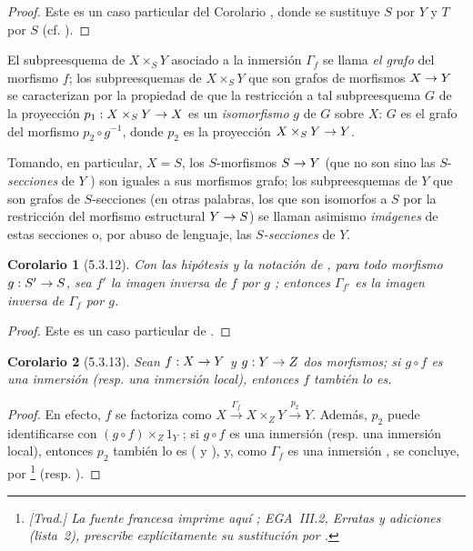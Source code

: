 \documentclass[oneside]{amsart}
\theoremstyle{ega-env-style}
\theoremstyle{ega-thm-env-style}
\newtheorem*{corollary}{Corolario}
\theoremstyle{ega-defn-env-style}
\renewcommand{\to}{\mathchoice{\longrightarrow}{\rightarrow}{\rightarrow}{\rightarrow}}
\newcommand{\oldpage}[2][]{{\marginnote{\normalfont{\textbf{#1}~|~#2}}}\ignorespaces}
\let\EGAOriginalLabel\label
\renewcommand{\label}[1]{\phantomsection\EGAOriginalLabel{#1}}
\begin{document}
\begin{proof}
Este es un caso particular del Corolario , donde se sustituye $S$ por $Y$ y $T$ por $S$ (cf. ).
\end{proof}

\oldpage[I]{134}
El subpreesquema de $X\times_S Y$ asociado a la inmersión $\Gamma_f$  se llama \emph{el grafo} del morfismo $f$;
los subpreesquemas de $X\times_S Y$ que son grafos de morfismos $X\to Y$ se caracterizan por la propiedad de que la restricción a tal subpreesquema $G$ de la proyección $p_1:X\times_S Y\to X$ es un \emph{isomorfismo} $g$ de $G$ sobre $X$:
$G$ es el grafo del morfismo $p_2\circ g^{-1}$, donde $p_2$ es la proyección $X\times_S Y\to Y$.

Tomando, en particular, $X=S$, los $S$-morfismos $S\to Y$ (que no son sino las $S$-\emph{secciones} de $Y$ ) son iguales a sus morfismos grafo;
los subpreesquemas de $Y$ que son grafos de $S$-secciones (en otras palabras, los que son isomorfos a $S$ por la restricción del morfismo estructural $Y\to S$) se llaman asimismo \emph{imágenes} de estas secciones o, por abuso de lenguaje, las \emph{$S$-secciones} de $Y$.

\begin{corollary}[5.3.12]
\label{I.5.3.12}
Con las hipótesis y la notación de , para todo morfismo $g:S'\to S$, sea $f'$ la imagen inversa de $f$ por $g$ ;
entonces $\Gamma_{f'}$ es la imagen inversa de $\Gamma_f$ por $g$.
\end{corollary}

\begin{proof}
Este es un caso particular de .
\end{proof}

\begin{corollary}[5.3.13]
\label{I.5.3.13}
Sean $f:X\to Y$ y $g:Y\to Z$ dos morfismos;
si $g\circ f$ es una inmersión (\textup{resp.} una inmersión local), entonces $f$ también lo es.
\end{corollary}

\begin{proof}
En efecto, $f$ se factoriza como $X\xrightarrow{\Gamma_f}X\times_Z Y\xrightarrow{p_2}Y$.
Además, $p_2$ puede identificarse con $(g\circ f)\times_Z 1_Y$ ;
si $g\circ f$ es una inmersión (resp. una inmersión local), entonces $p_2$ también lo es ( y ), y, como $\Gamma_f$ es una inmersión , se concluye, por \footnote{\emph{[Trad.] La fuente francesa imprime aquí ; EGA~III.2, Erratas y adiciones (lista~2), prescribe explícitamente su sustitución por .}} (resp. ).
\end{proof}
\end{document}
